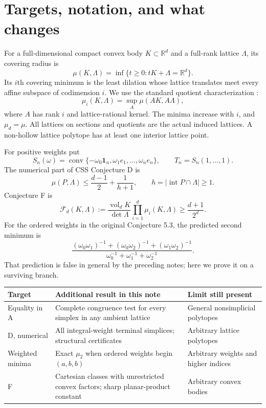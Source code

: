 \documentclass[11pt,a4paper]{article}
\theoremstyle{remark}\newtheorem{remark}[theorem]{Remark}
\DeclareMathOperator{\conv}{conv}
\DeclareMathOperator{\vol}{vol}
\newcommand{\R}{\mathbb R}\newcommand{\Z}{\mathbb Z}
\begin{document}
\section{Targets, notation, and what changes}

For a full-dimensional compact convex body $K\subset\R^d$ and a
full-rank lattice $\Lambda$, its covering radius is
\[
 \mu(K,\Lambda)=\inf\{t\ge0:tK+\Lambda=\R^d\}.
\]
Its $i$th covering minimum is the least dilation whose lattice translates
meet every affine subspace of codimension $i$. We use the standard
quotient characterization \cite{CSS,GMS}:
\[
 \mu_i(K,\Lambda)=\sup_A\mu(AK,A\Lambda),
\]
where $A$ has rank $i$ and lattice-rational kernel. The minima increase
with $i$, and $\mu_d=\mu$. All lattices on sections and quotients are
the actual induced lattices. A non-hollow lattice polytope has at least
one interior lattice point.

For positive weights put
\[
 S_n(\omega)=\conv\{-\omega_0\mathbf1_n,
                    \omega_1e_1,\ldots,\omega_ne_n\},
 \qquad T_n=S_n(1,\ldots,1).
\]
The numerical part of CSS Conjecture D is
\begin{equation}\label{intro:D}
 \mu(P,\Lambda)\le\frac{d-1}{2}+\frac1{h+1},
 \qquad h=|\operatorname{int}P\cap\Lambda|\ge1.
\end{equation}
Conjecture F is
\begin{equation}\label{intro:F}
 \mathcal F_d(K,\Lambda):=
 \frac{\vol_dK}{\det\Lambda}\prod_{i=1}^{d}\mu_i(K,\Lambda)
 \ge\frac{d+1}{2^d}.
\end{equation}
For the ordered weights in the original Conjecture 5.3, the predicted
second minimum is
\[
 \frac{(\omega_0\omega_1)^{-1}+
       (\omega_0\omega_2)^{-1}+(\omega_1\omega_2)^{-1}}
      {\omega_0^{-1}+\omega_1^{-1}+\omega_2^{-1}}.
\]
That prediction is false in general by the preceding notes; here we
prove it on a surviving branch.

\begin{center}\small
\begin{tabularx}{\linewidth}{@{}>{\raggedright\arraybackslash}p{.16\linewidth}>{\raggedright\arraybackslash}X>{\raggedright\arraybackslash}X@{}}
\toprule
Target & Additional result in this note & Limit still present\\
\midrule
Equality in A & Complete congruence test for every simplex in any ambient lattice & General nonsimplicial polytopes\\
D, numerical & All integral-weight terminal simplices; structural certificates & Arbitrary lattice polytopes\\
Weighted minima & Exact $\mu_2$ when ordered weights begin $(a,b,b)$ & Arbitrary weights and higher indices\\
F & Cartesian classes with unrestricted convex factors; sharp planar-product constant & Arbitrary convex bodies\\
\bottomrule
\end{tabularx}
\end{center}
\end{document}
